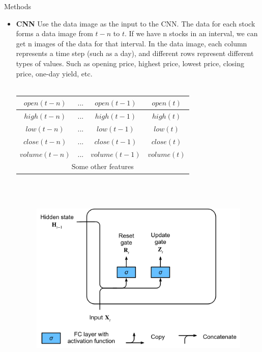 \documentclass[final]{beamer}
\newlength{\colwidth}
\begin{document}
\begin{frame}[t]
\begin{columns}[t]
\begin{column}{\colwidth}
  \begin{alertblock}{Methods}
    \begin{itemize}
      \item \textbf{CNN} Use the data image as the input to the CNN. The data for each stock forms a data image from $t - n$ to $t$. If we have n stocks in an interval, we can get n images of the data for that interval. In the data image, each column represents a time step (such as a day), and different rows represent different types of values. Such as opening price, highest price, lowest price, closing price, one-day yield, etc.
        \\ \hspace*{\fill} \\
      \begin{center}
      \begin{tabular}{|c|c|c|c|}%
    \hline  %
    $open(t-n)$&$...$&$open(t-1)$&$open(t)$\\
    \hline  
    $high(t-n)$&$...$&$high(t-1)$&$high(t)$\\
    \hline  
    $low(t-n)$&$...$&$low(t-1)$&$low(t)$\\
    \hline  
    $close(t-n)$&$...$&$close(t-1)$&$close(t)$\\
    \hline  
    $volume(t-n)$&$...$&$volume(t-1)$&$volume(t)$\\
    \hline  
    \multicolumn{4}{|c|}{Some other features}\\
    \hline %
    \end{tabular}
    \end{center}
    \\ \hspace*{\fill} \\
\begin{figure}
  \centering
  \includegraphics[scale=0.8]{gru-1.png}

\end{figure}
\end{itemize}
\end{alertblock}
\end{column}
\end{columns}
\end{frame}
\end{document}
